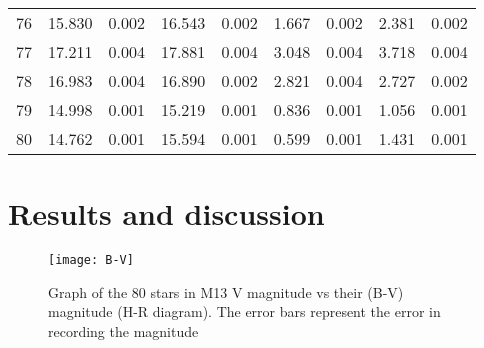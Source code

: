 \documentclass[10pt]{article}
\begin{document}
\begin{longtable}[c]{ccccc|cccc}
76 & \cellcolor{ gray!10 }  15.830 &  0.002 & \cellcolor{ gray!10 }  16.543 &  0.002 & \cellcolor{ gray!10 }  1.667 &  0.002 & \cellcolor{ gray!10 }  2.381 &  0.002 \\
77 & \cellcolor{ gray!10 }  17.211 &  0.004 & \cellcolor{ gray!10 }  17.881 &  0.004 & \cellcolor{ gray!10 }  3.048 &  0.004 & \cellcolor{ gray!10 }  3.718 &  0.004 \\
78 & \cellcolor{ gray!10 }  16.983 &  0.004 & \cellcolor{ gray!10 }  16.890 &  0.002 & \cellcolor{ gray!10 }  2.821 &  0.004 & \cellcolor{ gray!10 }  2.727 &  0.002 \\
79 & \cellcolor{ gray!10 }  14.998 &  0.001 & \cellcolor{ gray!10 }  15.219 &  0.001 & \cellcolor{ gray!10 }  0.836 &  0.001 & \cellcolor{ gray!10 }  1.056 &  0.001 \\
80 & \cellcolor{ gray!10 }  14.762 &  0.001 & \cellcolor{ gray!10 }  15.594 &  0.001 & \cellcolor{ gray!10 }  0.599 &  0.001 & \cellcolor{ gray!10 }  1.431 &  0.001 \\

\end{longtable}

\section{Results and discussion}
\vspace{-6mm}
\begin{figure}[h]
	\centering
	\texttt{[image: B-V]}
	\caption{Graph of the 80 stars in M13 V magnitude vs their (B-V) magnitude (H-R diagram). The error bars represent the error in recording the magnitude }
	\label{fig:b-v}
\end{figure}
\end{document}
